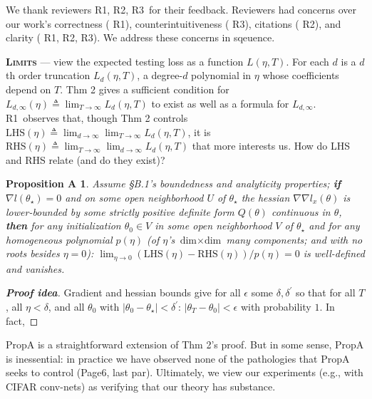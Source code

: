 \documentclass{article}
\newcommand{\Ra}{\textmd{\textsf{\color{purple!50} {R1}}}}
\newcommand{\Rb}{\textmd{\textsf{\color{green!50}  {R2}}}}
\newcommand{\Rc}{\textmd{\textsf{\color{blue!50}   {R3}}}}
\newcommand{\pag}[1]{\textmd{\textsf{Page#1}}}
\newcommand{\thm}[1]{\textmd{\textsf{Thm #1}}}
\newcommand{\prp}[1]{\textmd{\textsf{Prop#1}}}
\newcommand{\moosect}[1]{\par\textsc{\textbf{#1}} ---}
\newtheorem*{proposition*}{{Proposition A}}
\begin{document}
    We thank reviewers \Ra, \Rb, \Rc\ for their feedback.  Reviewers had
    concerns over our work's correctness (\Ra), counterintuitiveness (\Rc), 
    citations (\Rb), and clarity (\Ra,\Rb,\Rc).  We address these concerns in
    sqeuence. 

\moosect{Limits}
    view the expected testing loss as a function
    $L(\eta, T)$.  For each $d$ is a $d$th order truncation $L_d(\eta, T)$, a
    degree-$d$ polynomial in $\eta$ whose coefficients depend on $T$.
    \thm{2} gives a sufficient condition for $L_{d,\infty}(\eta) \triangleq
    \lim_{T\to\infty} L_{d}(\eta,T)$ to exist as well as 
    a formula for $L_{d,\infty}$. %
    \Ra\ observes that, though \thm{2} controls
    $\text{LHS}(\eta)\triangleq \lim_{d\to\infty} \lim_{T\to \infty}
    L_d(\eta,T)$, it is $\text{RHS}(\eta)\triangleq \lim_{T\to\infty}
    \lim_{d\to\infty} L_d(\eta,T)$ that more interests us.  How do LHS and
    RHS relate (and do they exist)?
    \begin{proposition*}\vspace{-0.25cm}
        Assume \S B.1's boundedness and analyticity properties;
        {\textbf{if}} $\nabla l(\theta_\star)=0$ and on some
        open neighborhood $U$ of $\theta_\star$ the hessian $\nabla\nabla
        l_x(\theta)$ is lower-bounded by some strictly positive definite form
        $Q(\theta)$ continuous in $\theta$, {\textbf{then}} for any
        initialization $\theta_0\in V$ in some open neighborhood $V$ of
        $\theta_\star$ and for any homogeneous polynomial $p(\eta)$ (of
        $\eta$'s $\text{dim}\times\text{dim}$ many components; and with no roots
        besides $\eta=0$): $\lim_{\eta\to 0}
        (\text{LHS}(\eta)-\text{RHS}(\eta))/p(\eta) = 0$ is well-defined and vanishes.\vspace{-0.25cm}
    \end{proposition*}
    \begin{proof}[\textbf{Proof idea}]
        Gradient and hessian bounds give for all $\epsilon$ some
        $\delta,\delta^\prime$ so that for all $T$, all $\eta<\delta$, and all
        $\theta_0$ with $|\theta_0-\theta_\star|<\delta^\prime$:
        $|\theta_T-\theta_0|<\epsilon$ with probability $1$.
        In fact, 
        {\color{moor}{FILL IN}}
        \vspace{-0.25cm}
    \end{proof}
    \noindent
    \prp{A} is a straightforward extension of \thm{2}'s proof.  But in
    some sense, \prp{A} is inessential: in practice we have observed none
    of the pathologies that \prp{A} seeks to control (\pag{6, last par}).
    Ultimately, we view our experiments (e.g., with CIFAR conv-nets) as
    verifying that our theory has substance.
\end{document}
